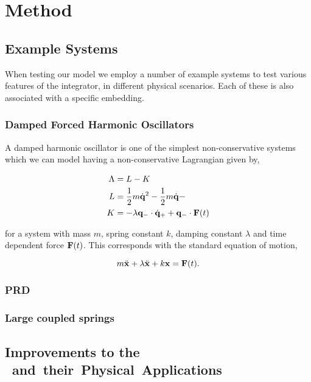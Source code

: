 \section{Method}
\subsection{Example Systems}
\label{sec:eg-sys}

When testing our model we employ a number of example systems to test various features of the integrator, in different physical scenarios. Each of these is also associated with a specific embedding.

\subsubsection{Damped Forced Harmonic Oscillators}

A damped harmonic oscillator is one of the simplest non-conservative systems which we can model having a non-conservative Lagrangian given by\cite{galleyPrincipleStationaryNonconservative2014},

\begin{equation}
\begin{aligned}
  \Lambda &= L - K \\
  L &= \frac12 m\dot{\vb{q}}^2 - \frac12 m\dot{\vb{q}} -  \\
  K &= - \lambda\vb{q}_- \cdot \dot {\vb{q}}_+ + \vb{q}_- \cdot \vb{F}(t)
\end{aligned}
\end{equation}

for a system with mass $m$, spring constant $k$, damping constant $\lambda$ and time dependent force $\vb{F}(t)$. This corresponds with the standard equation of motion,

\begin{equation}
  m \ddot{\vb x} + \lambda \ddot{\vb x} + k \vb x = \vb F(t).
\end{equation}

\subsubsection{PRD}

\subsubsection{Large coupled springs}

\subsection{Improvements to the \SI{} and their Physical Applications}

